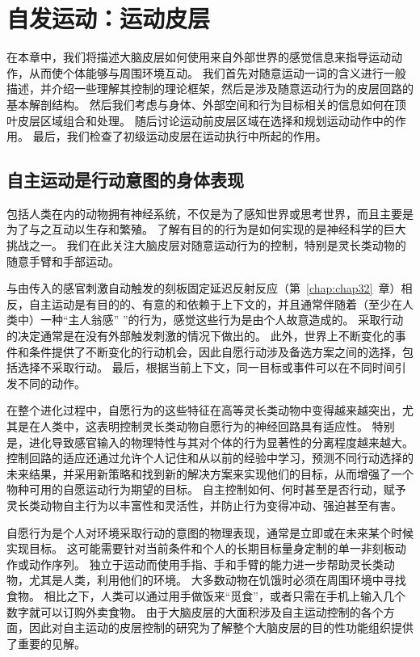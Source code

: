 \chapter{自发运动：运动皮层} \label{chap:chap34}

在本章中，我们将描述大脑皮层如何使用来自外部世界的感觉信息来指导运动动作，从而使个体能够与周围环境互动。
我们首先对随意运动一词的含义进行一般描述，并介绍一些理解其控制的理论框架，然后是涉及随意运动行为的皮层回路的基本解剖结构。
然后我们考虑与身体、外部空间和行为目标相关的信息如何在顶叶皮层区域组合和处理。
随后讨论运动前皮层区域在选择和规划运动动作中的作用。
最后，我们检查了初级运动皮层在运动执行中所起的作用。



\section{自主运动是行动意图的身体表现}

包括人类在内的动物拥有神经系统，不仅是为了感知世界或思考世界，而且主要是为了与之互动以生存和繁殖。
了解有目的的行为是如何实现的是神经科学的巨大挑战之一。
我们在此关注大脑皮层对随意运动行为的控制，特别是灵长类动物的随意手臂和手部运动。


与由传入的感官刺激自动触发的刻板固定延迟反射反应（第~\ref{chap:chap32}~章）相反，自主运动是有目的的、有意的和依赖于上下文的，并且通常伴随着（至少在人类中）一种“主人翁感” ”的行为，感觉这些行为是由个人故意造成的。
采取行动的决定通常是在没有外部触发刺激的情况下做出的。
此外，世界上不断变化的事件和条件提供了不断变化的行动机会，因此自愿行动涉及备选方案之间的选择，包括选择不采取行动。
最后，根据当前上下文，同一目标或事件可以在不同时间引发不同的动作。


在整个进化过程中，自愿行为的这些特征在高等灵长类动物中变得越来越突出，尤其是在人类中，这表明控制灵长类动物自愿行为的神经回路具有适应性。
特别是，进化导致感官输入的物理特性与其对个体的行为显著性的分离程度越来越大。
控制回路的适应还通过允许个人记住和从以前的经验中学习，预测不同行动选择的未来结果，并采用新策略和找到新的解决方案来实现他们的目标，从而增强了一个物种可用的自愿运动行为期望的目标。
自主控制如何、何时甚至是否行动，赋予灵长类动物自主行为以丰富性和灵活性，并防止行为变得冲动、强迫甚至有害。


自愿行为是个人对环境采取行动的意图的物理表现，通常是立即或在未来某个时候实现目标。
这可能需要针对当前条件和个人的长期目标量身定制的单一非刻板动作或动作序列。
独立于运动而使用手指、手和手臂的能力进一步帮助灵长类动物，尤其是人类，利用他们的环境。
大多数动物在饥饿时必须在周围环境中寻找食物。
相比之下，人类可以通过用手做饭来“觅食”，或者只需在手机上输入几个数字就可以订购外卖食物。
由于大脑皮层的大面积涉及自主运动控制的各个方面，因此对自主运动的皮层控制的研究为了解整个大脑皮层的目的性功能组织提供了重要的见解。



